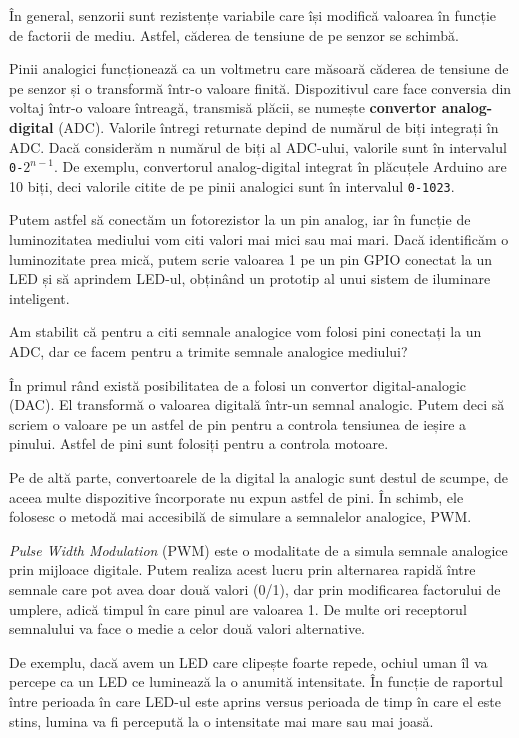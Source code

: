 În general, senzorii sunt rezistențe variabile care își modifică valoarea în
funcție de factorii de mediu. Astfel, căderea de tensiune de pe senzor se
schimbă.

Pinii analogici funcționează ca un voltmetru care măsoară căderea de tensiune de
pe senzor și o transformă într-o valoare finită. Dispozitivul care face
conversia din voltaj într-o valoare întreagă, transmisă plăcii, se numește
\textbf{convertor analog-digital} (ADC). Valorile întregi returnate depind de numărul de
biți integrați în ADC. Dacă considerăm n numărul de biți al ADC-ului, valorile
sunt în intervalul \texttt{0-$2^{n-1}$}. De exemplu, convertorul analog-digital integrat
în plăcuțele Arduino are 10 biți, deci valorile citite de pe pinii analogici
sunt în intervalul \texttt{0-1023}.

Putem astfel să conectăm un fotorezistor la un pin analog, iar în funcție de
luminozitatea mediului vom citi valori mai mici sau mai mari. Dacă identificăm o
luminozitate prea mică, putem scrie valoarea 1 pe un pin GPIO conectat la un LED
și să aprindem LED-ul, obținând un prototip al unui sistem de iluminare
inteligent.

Am stabilit că pentru a citi semnale analogice vom folosi pini conectați la un
ADC, dar ce facem pentru a trimite semnale analogice mediului?

În primul rând există posibilitatea de a folosi un convertor digital-analogic
(DAC). El transformă o valoarea digitală într-un semnal analogic. Putem deci să
scriem o valoare pe un astfel de pin pentru a controla tensiunea de ieșire a
pinului. Astfel de pini sunt folosiți pentru a controla motoare.

Pe de altă parte, convertoarele de la digital la analogic sunt destul de scumpe,
de aceea multe dispozitive încorporate nu expun astfel de pini. În schimb, ele
folosesc o metodă mai accesibilă de simulare a semnalelor analogice, PWM.

\textit{Pulse Width Modulation} (PWM) este o modalitate de a simula semnale analogice
prin mijloace digitale. Putem realiza acest lucru prin alternarea rapidă între
semnale care pot avea doar două valori (0/1), dar prin modificarea factorului de
umplere, adică timpul în care pinul are valoarea 1. De multe ori receptorul
semnalului va face o medie a celor două valori alternative.

De exemplu, dacă avem un LED care clipește foarte repede, ochiul uman îl va
percepe ca un LED ce luminează la o anumită intensitate. În funcție de raportul
între perioada în care LED-ul este aprins versus perioada de timp în care el
este stins, lumina va fi percepută la o intensitate mai mare sau mai joasă.

